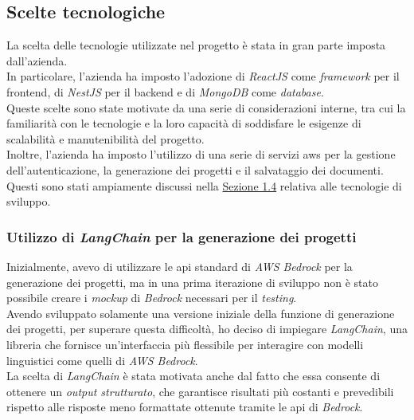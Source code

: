 \subsection{Scelte tecnologiche}
\label{subsec:scelte-tecnologiche}

La scelta delle tecnologie utilizzate nel progetto è stata in gran parte imposta dall'azienda.\\
In particolare, l'azienda ha imposto l'adozione di \textit{ReactJS} come \textit{framework} per il \gls{frontend}, di \textit{NestJS} per il \gls{backend} e di \textit{MongoDB} come \textit{database}.\\
Queste scelte sono state motivate da una serie di considerazioni interne, tra cui la familiarità con le tecnologie e la loro capacità di soddisfare le esigenze di scalabilità e manutenibilità del progetto.\\

\noindent Inoltre, l'azienda ha imposto l'utilizzo di una serie di servizi \gls{aws} per la gestione dell'autenticazione, la generazione dei progetti e il salvataggio dei documenti.\\
Questi sono stati ampiamente discussi nella {\hyperref[sez:tecnologie-sviluppo]{Sezione 1.4}} relativa alle tecnologie di sviluppo.

\subsubsection{Utilizzo di \textit{LangChain} per la generazione dei progetti}

Inizialmente, avevo di utilizzare le \gls{api} standard di \textit{AWS Bedrock} per la generazione dei progetti, ma in una prima iterazione di sviluppo non è stato possibile creare i \textit{mockup} di \textit{Bedrock} necessari per il \textit{testing}.\\

\noindent Avendo sviluppato solamente una versione iniziale della funzione di generazione dei progetti, per superare questa difficoltà, ho deciso di impiegare \textit{LangChain}, una libreria che fornisce un'interfaccia più flessibile per interagire con modelli linguistici come quelli di \textit{AWS Bedrock}.\\

\noindent La scelta di \textit{LangChain} è stata motivata anche dal fatto che essa consente di ottenere un \textit{output strutturato}, che garantisce risultati più costanti e prevedibili rispetto alle risposte meno formattate ottenute tramite le \gls{api} di \textit{Bedrock}.\\


